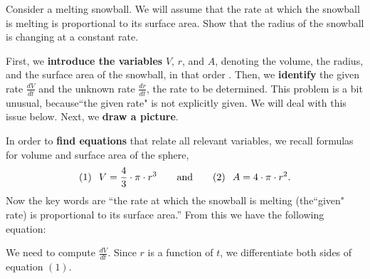 \documentclass{ximera}
\begin{document}
\begin{example}
  Consider a melting snowball. We will assume that the rate at which the
  snowball is melting is proportional to its surface area. Show that
  the radius of the snowball is changing at a constant rate.
  
\begin{explanation}
First, we \textbf{introduce the variables} $V$, $r$, and $A$, denoting the volume, the radius, and the surface area of the snowball, in that order . Then, we \textbf{identify} the given rate $\frac{dV}{dt}$  and the unknown rate $\frac{dr}{dt}$, the rate to be determined. This problem is a bit unusual, because``the given  rate" is not explicitly given. We will deal with this issue below. 
  Next, we \textbf{draw a picture}.
  \begin{image}
  \end{image}
  In order to \textbf{find equations} that relate all relevant variables, we recall formulas for volume and surface area of the sphere,
  \[
(1) \hspace{0.1in} V =\frac{4}{3} \cdot \pi \cdot r^3 \qquad\text{and}\qquad  (2) \hspace{0.1in} A = 4\cdot
  \pi \cdot r^2.
  \]
  Now the key words are ``the rate at which the snowball is melting (the``given" rate) is
  proportional to its surface area.'' From this we have the following
  equation:
  \begin{image}
  \end{image}
  We need to compute  $\frac{dV}{dt}$. Since $r$ is a function of $t$, we  differentiate both sides of equation $(1)$. 

\end{explanation}
\end{example}
\end{document}
